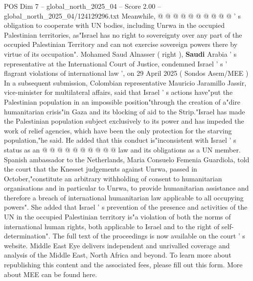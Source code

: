 \begin{textsample}{POS Dim 7 – global\_north\_2025\_04 – Score 2.00 – global\_north\_2025\_04/124129296.txt}
Meanwhile, @ @ @ @ @ @ @ @ @ @ ' s obligation to cooperate with UN bodies, including Unrwa in the occupied Palestinian territories, as"Israel has no right to sovereignty over any part of the occupied Palestinian Territory and can not exercise sovereign powers there by virtue of its occupation".
Mohamed Saud Alnasser ( right ), \textbf{Saudi} Arabia ' s representative at the International Court of Justice, condemned Israel ' s ' flagrant violations of international law ', on 29 April 2025 ( Sondos Asem/MEE ) In a subsequent submission, Colombian representative Mauricio Jaramillo Jassir, vice-minister for multilateral affairs, said that Israel ' s actions have"put the Palestinian population in an impossible position"through the creation of a"dire humanitarian crisis"in Gaza and its blocking of aid to the Strip."Israel has made the Palestinian population subject exclusively to its power and has impeded the work of relief agencies, which have been the only protection for the starving population,"he said.
He added that this conduct is"inconsistent with Israel ' s status as an @ @ @ @ @ @ @ @ @ @ law and its obligations as a UN member.
Spanish ambassador to the Netherlands, Maria Consuelo Femenia Guardiola, told the court that the Knesset judgements against Unrwa, passed in October,"constitute an arbitrary withholding of consent to humanitarian organisations and in particular to Unrwa, to provide humanitarian assistance and therefore a breach of international humanitarian law applicable to all occupying powers".
She added that Israel ' s prevention of the presence and activities of the UN in the occupied Palestinian territory is"a violation of both the norms of international human rights, both applicable to Israel and to the right of self-determination".
The full text of the proceedings is now available on the court ' s website.
Middle East Eye delivers independent and unrivalled coverage and analysis of the Middle East, North Africa and beyond.
To learn more about republishing this content and the associated fees, please fill out this form.
More about MEE can be found here.

\end{textsample}
